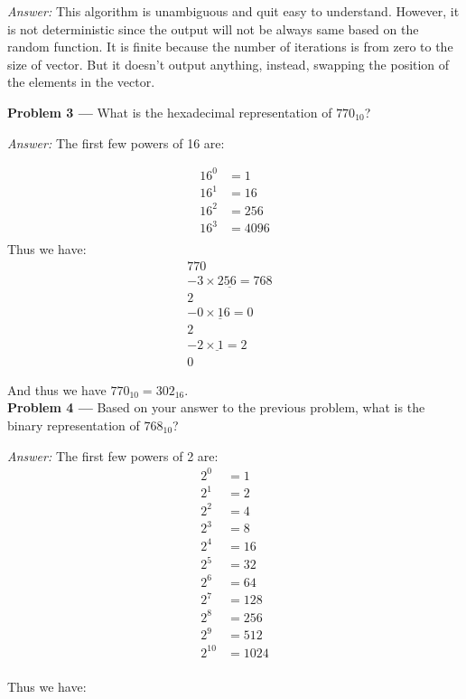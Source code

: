 \documentclass[11pt]{article}
\newcommand{\problem}[1]{\vspace*{2ex}\textbf{Problem #1 ---} }
\newcommand{\answer}{\textit{Answer: } }
\begin{document}
\answer This algorithm is unambiguous and quit easy to
understand. However, it is not deterministic since the output will not
be always same based on the random function. It is finite because the
number of iterations is from zero to the size of vector. But it
doesn't output anything, instead, swapping the position of the
elements in the vector.

\problem{3} What is the hexadecimal representation of $770_{10}$?

\answer The first few powers of 16 are:

\begin{align*}
  16^0 &= 1\\
  16^1 &= 16\\
  16^2 &= 256\\
  16^3 &= 4096\\
\end{align*}
Thus we have:
\begin{equation*}
  \begin{split}
    770&\\
    \underline{-3 \times 256 = 768}&\\
    2&\\
    \underline{-0 \times 16 = 0}&\\
    2&\\
    \underline{-2 \times 1 = 2}&\\
    0&
  \end{split}
\end{equation*}

And thus we have $770_{10} = 302_{16}$.\\
\problem{4} Based on your answer to the previous problem, what is the binary representation of $768_{10}$?

\answer The first few powers of 2 are:
\begin{align*}
 2^0 &= 1\\
 2^1 &= 2\\
 2^2 &= 4\\
 2^3 &= 8\\
 2^4 &= 16\\
 2^5 &= 32\\
 2^6 &= 64\\
 2^7 &= 128\\
 2^8 &= 256\\
 2^9 &= 512\\
 2^{10} &= 1024\\
\end{align*}

Thus we have:
\end{document}
